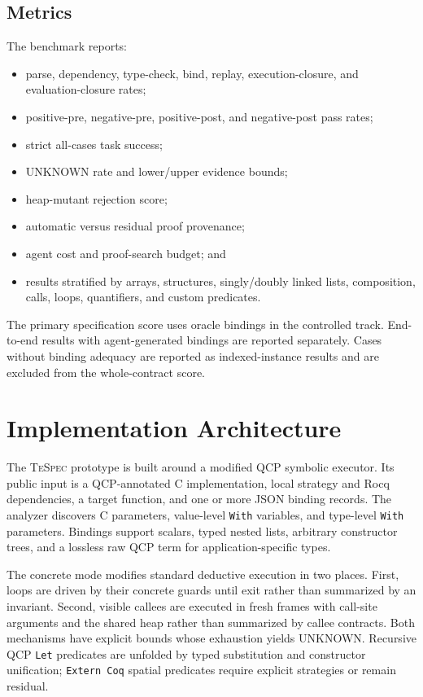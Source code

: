 \documentclass[10pt]{article}
\newcommand{\tespec}{\textsc{TeSpec}}
\newcommand{\qcp}{\textsc{QCP}}
\newcommand{\rocq}{Rocq}
\newcommand{\unknown}{\textsf{UNKNOWN}}
\begin{document}
\subsection{Metrics}

The benchmark reports:
\begin{itemize}[leftmargin=1.4em]
  \item parse, dependency, type-check, bind, replay, execution-closure, and
        evaluation-closure rates;
  \item positive-pre, negative-pre, positive-post, and negative-post pass rates;
  \item strict all-cases task success;
  \item \unknown{} rate and lower/upper evidence bounds;
  \item heap-mutant rejection score;
  \item automatic versus residual proof provenance;
  \item agent cost and proof-search budget; and
  \item results stratified by arrays, structures, singly/doubly linked lists,
        composition, calls, loops, quantifiers, and custom predicates.
\end{itemize}

The primary specification score uses oracle bindings in the controlled track.
End-to-end results with agent-generated bindings are reported separately.
Cases without binding adequacy are reported as indexed-instance results and
are excluded from the whole-contract score.

\section{Implementation Architecture}
\label{sec:implementation}

The \tespec{} prototype is built around a modified \qcp{} symbolic executor.
Its public input is a QCP-annotated C implementation, local strategy and
\rocq{} dependencies, a target function, and one or more JSON binding records.
The analyzer discovers C parameters, value-level \texttt{With} variables, and
type-level \texttt{With} parameters.  Bindings support scalars, typed nested
lists, arbitrary constructor trees, and a lossless raw QCP term for
application-specific types.

The concrete mode modifies standard deductive execution in two places.  First,
loops are driven by their concrete guards until exit rather than summarized by
an invariant.  Second, visible callees are executed in fresh frames with
call-site arguments and the shared heap rather than summarized by callee
contracts.  Both mechanisms have explicit bounds whose exhaustion yields
\unknown.  Recursive QCP \texttt{Let} predicates are unfolded by typed
substitution and constructor unification; \texttt{Extern Coq} spatial
predicates require explicit strategies or remain residual.
\end{document}

